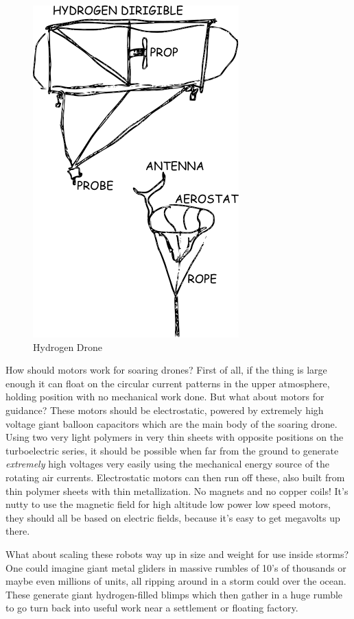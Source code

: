 \begin{figure}[htbp]
\centering
\includegraphics{images/dirigible.png}
\caption{Hydrogen Drone}
\end{figure}

How should motors work for soaring drones? First of all, if the thing is
large enough it can float on the circular current patterns in the upper
atmosphere, holding position with no mechanical work done. But what
about motors for guidance? These motors should be electrostatic, powered
by extremely high voltage giant balloon capacitors which are the main
body of the soaring drone. Using two very light polymers in very thin
sheets with opposite positions on the turboelectric series, it should be
possible when far from the ground to generate \emph{extremely} high
voltages very easily using the mechanical energy source of the rotating
air currents. Electrostatic motors can then run off these, also built
from thin polymer sheets with thin metallization. No magnets and no
copper coils! It's nutty to use the magnetic field for high altitude low
power low speed motors, they should all be based on electric fields,
because it's easy to get megavolts up there.

What about scaling these robots way up in size and weight for use inside
storms? One could imagine giant metal gliders in massive rumbles of 10's
of thousands or maybe even millions of units, all ripping around in a
storm could over the ocean. These generate giant hydrogen-filled blimps
which then gather in a huge rumble to go turn back into useful work near
a settlement or floating factory.

